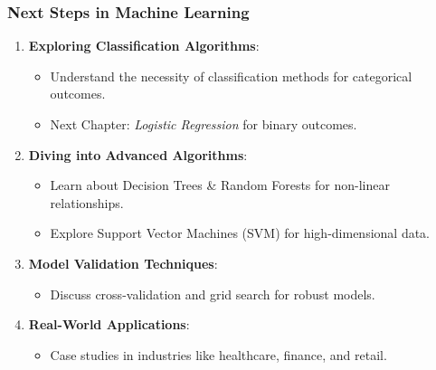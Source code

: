 \documentclass[aspectratio=169]{beamer}
\begin{document}
\begin{frame}[fragile]
    \frametitle{Next Steps in Machine Learning}
    
    \begin{enumerate}
        \item \textbf{Exploring Classification Algorithms}:
        \begin{itemize}
            \item Understand the necessity of classification methods for categorical outcomes.
            \item Next Chapter: \textit{Logistic Regression} for binary outcomes.
        \end{itemize}
        
        \item \textbf{Diving into Advanced Algorithms}:
        \begin{itemize}
            \item Learn about Decision Trees & Random Forests for non-linear relationships.
            \item Explore Support Vector Machines (SVM) for high-dimensional data.
        \end{itemize}
        
        \item \textbf{Model Validation Techniques}:
        \begin{itemize}
            \item Discuss cross-validation and grid search for robust models.
        \end{itemize}
        
        \item \textbf{Real-World Applications}:
        \begin{itemize}
            \item Case studies in industries like healthcare, finance, and retail.
        \end{itemize}
    \end{enumerate}
\end{frame}
\end{document}

